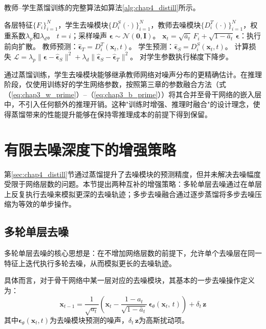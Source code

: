 教师--学生蒸馏训练的完整算法如算法\ref{alg:chap4_distill}所示。

\begin{algorithm}[htbp]
\caption{教师--学生蒸馏训练算法}
\label{alg:chap4_distill}
\begin{algorithmic}[1]
\REQUIRE 各层特征$\{F_i\}_{i=1}^{N}$，学生去噪模块$\{D^S_i(\cdot)\}_{i=1}^{N}$，教师去噪模块$\{D^T_i(\cdot)\}_{i=1}^{N}$，权重系数$\lambda_p$和$\lambda_d$。
\REPEAT
{}
\STATE $t = i$；采样噪声 $\boldsymbol{\epsilon} \sim \mathcal{N}(\mathbf{0}, \mathbf{I})$。
\STATE $\mathbf{x}_t = \sqrt{\bar{a}_t}\,F_i + \sqrt{1-\bar{a}_t}\,\boldsymbol{\epsilon}$：执行前向扩散。
\STATE 教师预测：$\hat{\boldsymbol{\epsilon}}_T = D^T_i(\mathbf{x}_t, t)$。
\STATE 学生预测：$\hat{\boldsymbol{\epsilon}}_S = D^S_i(\mathbf{x}_t, t)$。
\STATE 计算损失 $\mathcal{L} = \lambda_p\|\boldsymbol{\epsilon} - \hat{\boldsymbol{\epsilon}}_S\|^2 + \lambda_d\|\hat{\boldsymbol{\epsilon}}_S - \hat{\boldsymbol{\epsilon}}_T\|^2$。
\STATE 对学生参数执行梯度下降步。
\ENDFOR
{}
\end{algorithmic}
\end{algorithm}

通过蒸馏训练，学生去噪模块能够继承教师网络对噪声分布的更精确估计。在推理阶段，仅使用训练好的学生网络参数，按照第三章的参数融合方法（式（\ref{eq:chap3_w_prime}）--（\ref{eq:chap3_b_prime}））将其合并至骨干网络的嵌入层中，不引入任何额外的推理开销。这种"训练时增强、推理时融合"的设计理念，使得蒸馏带来的性能提升能够在保持零推理成本的前提下得到保留。

\section{有限去噪深度下的增强策略}
\label{sec:chap4_multi}

第\ref{sec:chap4_distill}节通过蒸馏提升了去噪模块的预测精度，但并未解决去噪幅度受限于网络层数的问题。本节提出两种互补的增强策略：多轮单层去噪通过在单层上反复执行去噪来模拟更深的去噪轨迹；多步去噪融合通过逐步蒸馏将多步去噪压缩为等效的单步操作。

\subsection{多轮单层去噪}

多轮单层去噪的核心思想是：在不增加网络层数的前提下，允许单个去噪层在同一特征上迭代执行多轮去噪，从而模拟更长的去噪轨迹。

具体而言，对于骨干网络中某一层对应的去噪模块，其基本的一步去噪操作定义为：
\begin{equation}
\mathbf{x}_{t-1} = \frac{1}{\sqrt{a_t}}\!\left(\mathbf{x}_t - \frac{1-a_t}{\sqrt{1-\bar{a}_t}}\,\boldsymbol{\epsilon}_\theta(\mathbf{x}_t,\, t)\right) + \delta_t\,\mathbf{z}
\label{eq:chap4_multi_basic}
\end{equation}
其中$\boldsymbol{\epsilon}_\theta(\mathbf{x}_t, t)$为去噪模块预测的噪声，$\delta_t\,\mathbf{z}$为高斯扰动项。

